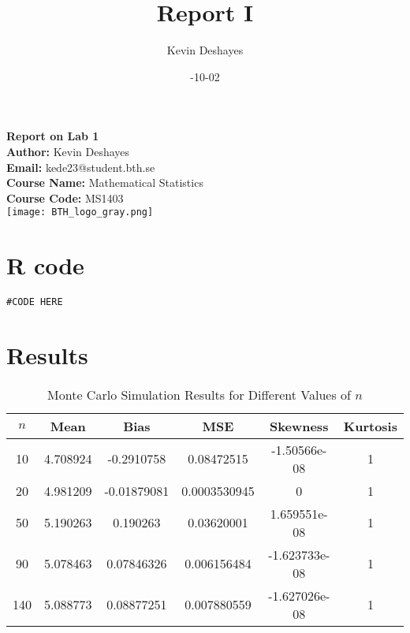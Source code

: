 \documentclass{report}
\title{Report I}
\author{Kevin Deshayes}
\date{\2024-10-02}
\begin{document}
\begin{titlepage}
  \centering
  {\huge\bfseries Report on Lab 1 \\[1cm]}  %
  \textbf{Author:} Kevin Deshayes\\[0.5cm]  %
  \textbf{Email:} kede23@student.bth.se\\[0.5cm]  %
  \textbf{Course Name:} Mathematical Statistics \\[0.5cm]  %
  \textbf{Course Code:} MS1403\\[1.5cm]  %

  \texttt{[image: BTH\_logo\_gray.png]} %
  \vfill
  \vspace{2cm}
\end{titlepage}

\tableofcontents
\newpage
\section{R code}



\begin{verbatim}
#CODE HERE
\end{verbatim}

\section{Results}
\begin{table}[htbp]
  \centering
  \begin{tabular}{|c|c|c|c|c|c|}
    \hline
    $n$ & Mean     & Bias        & MSE          & Skewness      & Kurtosis \\
    \hline
    10  & 4.708924 & -0.2910758  & 0.08472515   & -1.50566e-08  & 1        \\
    20  & 4.981209 & -0.01879081 & 0.0003530945 & 0             & 1        \\
    50  & 5.190263 & 0.190263    & 0.03620001   & 1.659551e-08  & 1        \\
    90  & 5.078463 & 0.07846326  & 0.006156484  & -1.623733e-08 & 1        \\
    140 & 5.088773 & 0.08877251  & 0.007880559  & -1.627026e-08 & 1        \\
    \hline
  \end{tabular}
  \caption{Monte Carlo Simulation Results for Different Values of $n$}
\end{table}
\end{document}
